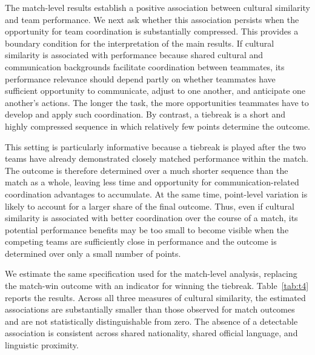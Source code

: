 \documentclass[10pt]{article}
\begin{document}

The match-level results establish a positive association between cultural similarity and team performance. We next ask whether this association persists when the opportunity for team coordination is substantially compressed. This provides a boundary condition for the interpretation of the main results. If cultural similarity is associated with performance because shared cultural and communication backgrounds facilitate coordination between teammates, its performance relevance should depend partly on whether teammates have sufficient opportunity to communicate, adjust to one another, and anticipate one another's actions. The longer the task, the more opportunities teammates have to develop and apply such coordination. By contrast, a tiebreak is a short and highly compressed sequence in which relatively few points determine the outcome.

This setting is particularly informative because a tiebreak is played after the two teams have already demonstrated closely matched performance within the match. The outcome is therefore determined over a much shorter sequence than the match as a whole, leaving less time and opportunity for communication-related coordination advantages to accumulate. At the same time, point-level variation is likely to account for a larger share of the final outcome. Thus, even if cultural similarity is associated with better coordination over the course of a match, its potential performance benefits may be too small to become visible when the competing teams are sufficiently close in performance and the outcome is determined over only a small number of points.

We estimate the same specification used for the match-level analysis, replacing the match-win outcome with an indicator for winning the tiebreak. Table~\ref{tab:t4} reports the results. Across all three measures of cultural similarity, the estimated associations are substantially smaller than those observed for match outcomes and are not statistically distinguishable from zero. The absence of a detectable association is consistent across shared nationality, shared official language, and linguistic proximity.
\end{document}
